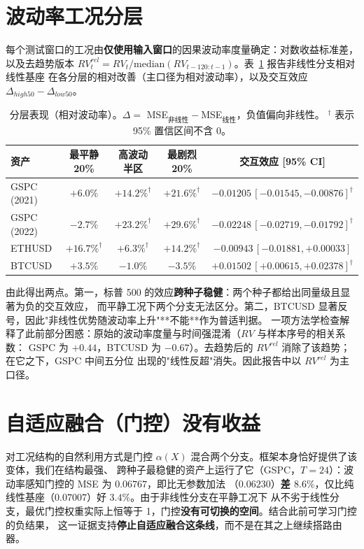 \documentclass[preprint,12pt]{elsarticle}
\begin{document}
\section{波动率工况分层}
\label{sec:regime}

每个测试窗口的工况由\textbf{仅使用输入窗口}的因果波动率度量确定：对数收益标准差，以及去趋势版本
$RV^{rel}_t = RV_t / \mathrm{median}(RV_{t-120:t-1})$。表~\ref{tab:regime} 报告非线性分支相对线性基座
在各分层的相对改善（主口径为相对波动率），以及交互效应 $\Delta_{high50} - \Delta_{low50}$。

\begin{table}[!t]
\centering
\small
\caption{分层表现（相对波动率）。$\Delta = $ MSE$_{非线性}-$MSE$_{线性}$，负值偏向非线性。
$^\dagger$ 表示 95\% 置信区间不含 0。}
\label{tab:regime}
\begin{tabular}{@{}lcccc@{}}
\toprule
资产 & 最平静 20\% & 高波动半区 & 最剧烈 20\% & 交互效应 [95\% CI] \\
\midrule
GSPC (2021) & $+6.0\%$      & $+14.2\%^\dagger$ & $+21.6\%^\dagger$ & $-0.01205\,[-0.01545,-0.00876]^\dagger$ \\
GSPC (2022) & $-2.7\%$      & $+23.2\%^\dagger$ & $+29.6\%^\dagger$ & $-0.02248\,[-0.02719,-0.01792]^\dagger$ \\
ETHUSD      & $+16.7\%^\dagger$ & $+6.3\%^\dagger$ & $+14.2\%^\dagger$ & $-0.00943\,[-0.01881,+0.00033]$ \\
BTCUSD      & $+3.5\%$      & $-1.0\%$          & $-3.5\%$          & $+0.01502\,[+0.00615,+0.02378]^\dagger$ \\
\bottomrule
\end{tabular}
\end{table}

由此得出两点。第一，标普 500 的效应\textbf{跨种子稳健}：两个种子都给出同量级且显著为负的交互效应，
而平静工况下两个分支无法区分。第二，BTCUSD 显著反号，因此"非线性优势随波动率上升"**不能**作为普适判据。
一项方法学检查解释了此前部分困惑：原始的波动率度量与时间强混淆（$RV$ 与样本序号的相关系数：
GSPC 为 $+0.44$，BTCUSD 为 $-0.67$）。去趋势后的 $RV^{rel}$ 消除了该趋势；在它之下，GSPC 中间五分位
出现的"线性反超"消失。因此报告中以 $RV^{rel}$ 为主口径。

\section{自适应融合（门控）没有收益}
\label{sec:gate}

对工况结构的自然利用方式是门控 $\alpha(X)$ 混合两个分支。框架本身恰好提供了该变体，我们在结构最强、
跨种子最稳健的资产上运行了它（GSPC，$T=24$）：波动率感知门控的 MSE 为 $0.06767$，即比无参数加法
（$0.06230$）\textbf{差 $8.6\%$}，仅比纯线性基座（$0.07007$）好 $3.4\%$。由于非线性分支在平静工况下
从不劣于线性分支，最优门控权重实际上恒等于 1，门控\textbf{没有可切换的空间}。结合此前可学习门控的负结果，
这一证据支持\textbf{停止自适应融合这条线}，而不是在其之上继续搭路由器。
\end{document}
